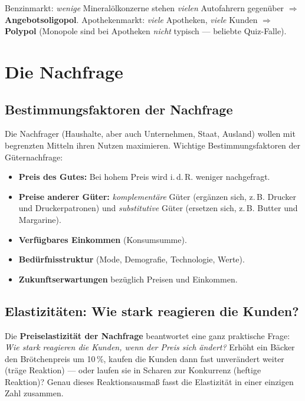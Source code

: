 \documentclass[11pt, a4paper]{article}
\begin{document}
\begin{beispiel}
Benzinmarkt: \emph{wenige} Mineralölkonzerne stehen \emph{vielen} Autofahrern gegenüber
$\Rightarrow$ \textbf{Angebotsoligopol}. Apothekenmarkt: \emph{viele} Apotheken,
\emph{viele} Kunden $\Rightarrow$ \textbf{Polypol} (Monopole sind bei Apotheken
\emph{nicht} typisch --- beliebte Quiz-Falle).
\end{beispiel}

\section{Die Nachfrage}

\subsection{Bestimmungsfaktoren der Nachfrage}

Die Nachfrager (Haushalte, aber auch Unternehmen, Staat, Ausland) wollen mit begrenzten
Mitteln ihren Nutzen maximieren. Wichtige Bestimmungsfaktoren der Güternachfrage:

\begin{itemize}
  \item \textbf{Preis des Gutes:} Bei hohem Preis wird i.\,d.\,R. weniger nachgefragt.
  \item \textbf{Preise anderer Güter:} \emph{komplementäre} Güter (ergänzen sich, z.\,B.
    Drucker und Druckerpatronen) und \emph{substitutive} Güter (ersetzen sich, z.\,B.
    Butter und Margarine).
  \item \textbf{Verfügbares Einkommen} (Konsumsumme).
  \item \textbf{Bedürfnisstruktur} (Mode, Demografie, Technologie, Werte).
  \item \textbf{Zukunftserwartungen} bezüglich Preisen und Einkommen.
\end{itemize}

\subsection{Elastizitäten: Wie stark reagieren die Kunden?}
\label{sec:elastizitaet}

Die \textbf{Preiselastizität der Nachfrage} beantwortet eine ganz praktische Frage:
\emph{Wie stark reagieren die Kunden, wenn der Preis sich ändert?} Erhöht ein Bäcker
den Brötchenpreis um 10\,\%, kaufen die Kunden dann fast unverändert weiter (träge
Reaktion) --- oder laufen sie in Scharen zur Konkurrenz (heftige Reaktion)? Genau
dieses Reaktionsausmaß fasst die Elastizität in einer einzigen Zahl zusammen.
\end{document}
